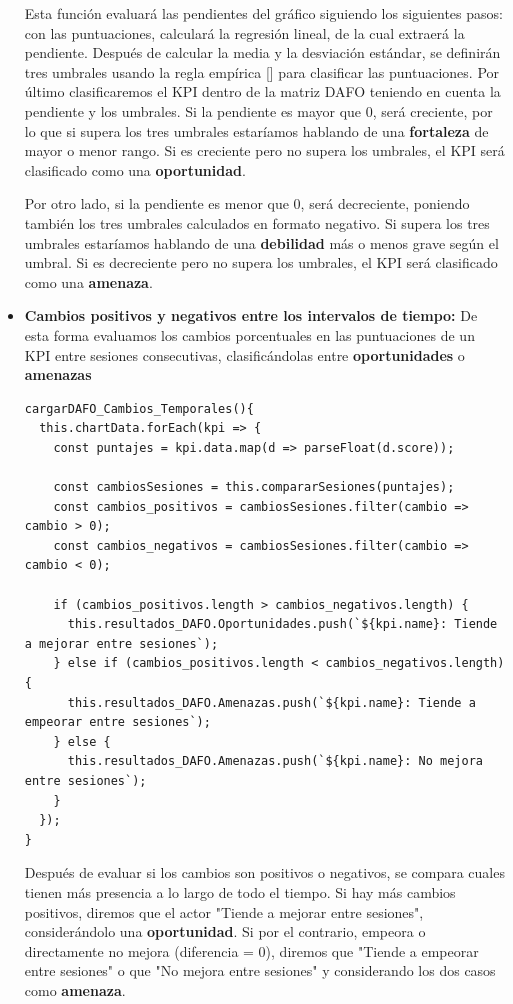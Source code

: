 \begin{itemize}
Esta función evaluará las pendientes del gráfico siguiendo los siguientes pasos: con las puntuaciones, calculará la regresión lineal, de la cual extraerá la pendiente. Después de calcular la media y la desviación estándar, se definirán tres umbrales usando la regla empírica [\cite{def_reglaemp}] para clasificar las puntuaciones. Por último clasificaremos el KPI dentro de la matriz DAFO teniendo en cuenta la pendiente y los umbrales. Si la pendiente es mayor que 0, será creciente, por lo que si supera los tres umbrales estaríamos hablando de una \textbf{fortaleza} de mayor o menor rango. Si es creciente pero no supera los umbrales, el KPI será clasificado como una \textbf{oportunidad}.

Por otro lado, si la pendiente es menor que 0, será decreciente, poniendo también los tres umbrales calculados en formato negativo. Si supera los tres umbrales estaríamos hablando de una \textbf{debilidad} más o menos grave según el umbral. Si es decreciente pero no supera los umbrales, el KPI será clasificado como una \textbf{amenaza}.

	\item \textbf{Cambios positivos y negativos entre los intervalos de tiempo:} De esta forma evaluamos  los cambios porcentuales en las puntuaciones de un KPI entre sesiones consecutivas, clasificándolas entre \textbf{oportunidades} o \textbf{amenazas}

\begin{lstlisting}[style=Javascript-color, caption={Función DAFO - Cambios entre sesiones},label=Javascript-color_code_tend]
cargarDAFO_Cambios_Temporales(){
  this.chartData.forEach(kpi => {
    const puntajes = kpi.data.map(d => parseFloat(d.score));

    const cambiosSesiones = this.compararSesiones(puntajes);
    const cambios_positivos = cambiosSesiones.filter(cambio => cambio > 0);
    const cambios_negativos = cambiosSesiones.filter(cambio => cambio < 0);

    if (cambios_positivos.length > cambios_negativos.length) {
      this.resultados_DAFO.Oportunidades.push(`${kpi.name}: Tiende a mejorar entre sesiones`);
    } else if (cambios_positivos.length < cambios_negativos.length){
      this.resultados_DAFO.Amenazas.push(`${kpi.name}: Tiende a empeorar entre sesiones`);
    } else {
      this.resultados_DAFO.Amenazas.push(`${kpi.name}: No mejora entre sesiones`);
    }
  });
}
\end{lstlisting}

Después de evaluar si los cambios son positivos o negativos, se compara cuales tienen más presencia a lo largo de todo el tiempo. Si hay más cambios positivos, diremos que el actor "Tiende a mejorar entre sesiones", considerándolo una \textbf{oportunidad}. Si por el contrario, empeora o directamente no mejora (diferencia = 0), diremos que "Tiende a empeorar entre sesiones" o que "No mejora entre sesiones" y considerando los dos casos como \textbf{amenaza}.

\end{itemize}

